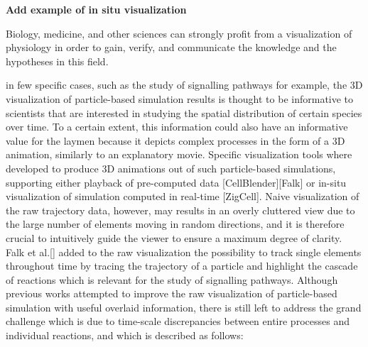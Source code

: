 \textbf{Add example of in situ visualization}

Biology, medicine, and other sciences can strongly profit from a visualization of physiology in order to gain, verify, and communicate the knowledge and the hypotheses in this field.




in few specific cases, such as the study of signalling pathways for example, the 3D visualization of particle-based simulation results is thought to be informative to scientists that are interested in studying the spatial distribution of certain species over time.
To a certain extent, this information could also have an informative value for the laymen because it depicts complex processes in the form of a 3D animation, similarly to an explanatory movie.
Specific visualization tools where developed to produce 3D animations out of such particle-based simulations, supporting either playback of pre-computed data [CellBlender][Falk] or in-situ visualization of simulation computed in real-time [ZigCell].
Naive visualization of the raw trajectory data, however, may results in an overly cluttered view due to the large number of elements moving in random directions, and it is therefore crucial to intuitively guide the viewer to ensure a maximum degree of clarity.
Falk et al.[] added to the raw visualization the possibility to track single elements throughout time by tracing the trajectory of a particle and highlight the cascade of reactions which is relevant for the study of signalling pathways.
Although previous works attempted to improve the raw visualization of particle-based simulation with useful overlaid information, there is still left to address the grand challenge which is due to time-scale discrepancies between entire processes and individual reactions, and which is described as follows: 

